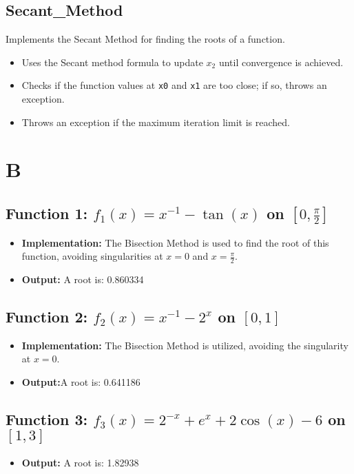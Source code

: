 \documentclass[a4paper]{article}
\begin{document}
\subsection{Secant\_Method}
Implements the Secant Method for finding the roots of a function.
\begin{itemize}
    \item Uses the Secant method formula to update \(x_2\) until convergence is achieved.
    \item Checks if the function values at \texttt{x0} and \texttt{x1} are too close; if so, throws an exception.
    \item Throws an exception if the maximum iteration limit is reached.
\end{itemize}

\section{B}
\subsection{Function 1: \(f_1(x) = x^{-1} - \tan(x)\) on \([0, \frac{\pi}{2}]\)}
\begin{itemize}
    \item \textbf{Implementation:} The Bisection Method is used to find the root of this function, avoiding singularities at \(x = 0\) and \(x = \frac{\pi}{2}\).
    \item \textbf{Output:} A root is: 0.860334
\end{itemize}

\subsection{Function 2: \(f_2(x) = x^{-1} - 2^x\) on \([0, 1]\)}
\begin{itemize}
    \item \textbf{Implementation:} The Bisection Method is utilized, avoiding the singularity at \(x = 0\).
    \item \textbf{Output:}A root is: 0.641186
\end{itemize}

\subsection{Function 3: \(f_3(x) = 2^{-x} + e^x + 2\cos(x) - 6\) on \([1, 3]\)}
\begin{itemize}
    \item \textbf{Output:} A root is: 1.82938
\end{itemize}
\end{document}

